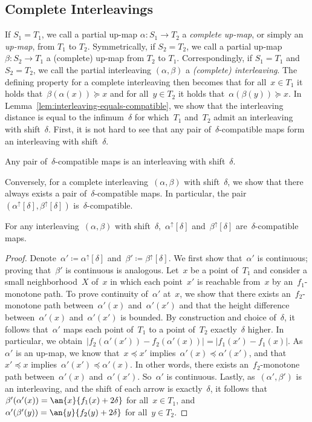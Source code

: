 \subsection{Complete Interleavings}\label{sec:complete-interleavings}
If $S_1=T_1$, we call a partial up-map $\alpha\colon S_1\to T_2$ a \emph{complete up-map}, or simply an \emph{up-map}, from $T_1$ to $T_2$.
Symmetrically, if $S_2=T_2$, we call a partial up-map $\beta\colon S_2\to T_1$ a (complete) up-map from $T_2$ to $T_1$.
Correspondingly, if $S_1=T_1$ and $S_2=T_2$, we call the partial interleaving $(\alpha,\beta)$ a \emph{(complete) interleaving}.
The defining property for a complete interleaving then becomes that for all~$x \in T_1$ it holds that~$\beta(\alpha(x)) \succeq x$ and for all~$y \in T_2$ it holds that~$\alpha(\beta(y)) \succeq x$.
In Lemma~\ref{lem:interleaving-equals-compatible}, we show that the interleaving distance is equal to the infimum~$\delta$ for which~$T_1$ and~$T_2$ admit an interleaving with shift~$\delta$.
First, it is not hard to see that any pair of~$\delta$-compatible maps form an interleaving with shift~$\delta$.
\begin{observation}\label{obs:compatible-interleaving}
    Any pair of~$\delta$-compatible maps is an interleaving with shift~$\delta$.
\end{observation}
%
\noindent
Conversely, for a complete interleaving~$(\alpha, \beta)$ with shift~$\delta$, we show that there always exists a pair of~$\delta$-compatible maps.
In particular, the pair~$(\alpha^\uparrow[\delta],\beta^\uparrow[\delta])$ is~$\delta$-compatible.
%
\begin{lemma}\label{lem:interleaving-compatible}
For any interleaving~$(\alpha, \beta)$ with shift~$\delta$,~$\alpha^\uparrow[\delta]$ and~$\beta^\uparrow[\delta]$ are~$\delta$-compatible maps.
\end{lemma}
\begin{proof}
    Denote~$\alpha' \coloneqq \alpha^\uparrow[\delta]$ and~$\beta' \coloneqq \beta^\uparrow[\delta]$.
	We first show that~$\alpha'$ is continuous; proving that~$\beta'$ is continuous is analogous.
	Let~$x$ be a point of~$T_1$ and consider a small neighborhood~$X$ of~$x$ in which each point~$x'$ is reachable from~$x$ by an~$f_1$-monotone path.
	To prove continuity of~$\alpha'$ at~$x$, we show that there exists an~$f_2$-monotone path between~$\alpha'(x)$ and~$\alpha'(x')$ and that the height difference between~$\alpha'(x)$ and~$\alpha'(x')$ is bounded.
    By construction and choice of~$\delta$, it follows that~$\alpha'$ maps each point of~$T_1$ to a point of~$T_2$ exactly~$\delta$ higher.
    In particular, we obtain~$|f_2(\alpha'(x')) - f_2(\alpha'(x))| = |f_1(x') - f_1(x)|$.
	As~$\alpha'$ is an up-map, we know that~$x \preceq x'$ implies~$\alpha'(x) \preceq \alpha'(x')$, and that~$x' \preceq x$ implies~$\alpha'(x') \preceq \alpha'(x)$.
    In other words, there exists an~$f_2$-monotone path between~$\alpha'(x)$ and~$\alpha'(x')$.
	So~$\alpha'$ is continuous.
%
	Lastly, as~$(\alpha', \beta')$ is an interleaving, and the shift of each arrow is exactly~$\delta$, it follows that~$\beta'(\alpha'(x)) = \an{x}{f_1(x) + 2\delta}$ for all~$x \in T_1$, and~$\alpha'(\beta'(y)) = \an{y}{f_2(y) + 2\delta}$ for all~$y \in T_2$.
\end{proof}
